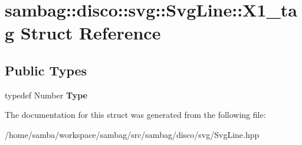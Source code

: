 \hypertarget{structsambag_1_1disco_1_1svg_1_1_svg_line_1_1_x1__tag}{
\section{sambag::disco::svg::SvgLine::X1\_\-tag Struct Reference}
\label{structsambag_1_1disco_1_1svg_1_1_svg_line_1_1_x1__tag}
}
\subsection*{Public Types}
\begin{DoxyCompactItemize}
\item 
\hypertarget{structsambag_1_1disco_1_1svg_1_1_svg_line_1_1_x1__tag_a3653fb8d3e6f0e3d049062920d3e7d25}{
typedef Number {\bfseries Type}}
\label{structsambag_1_1disco_1_1svg_1_1_svg_line_1_1_x1__tag_a3653fb8d3e6f0e3d049062920d3e7d25}

\end{DoxyCompactItemize}


The documentation for this struct was generated from the following file:\begin{DoxyCompactItemize}
\item 
/home/samba/workspace/sambag/src/sambag/disco/svg/SvgLine.hpp\end{DoxyCompactItemize}
